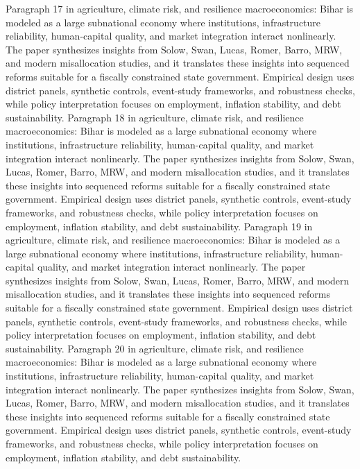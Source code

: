 \documentclass[preprint,12pt]{elsarticle}
\begin{document}
Paragraph 17 in agriculture, climate risk, and resilience macroeconomics: Bihar is modeled as a large subnational economy where institutions, infrastructure reliability, human-capital quality, and market integration interact nonlinearly. The paper synthesizes insights from Solow, Swan, Lucas, Romer, Barro, MRW, and modern misallocation studies, and it translates these insights into sequenced reforms suitable for a fiscally constrained state government. Empirical design uses district panels, synthetic controls, event-study frameworks, and robustness checks, while policy interpretation focuses on employment, inflation stability, and debt sustainability.
Paragraph 18 in agriculture, climate risk, and resilience macroeconomics: Bihar is modeled as a large subnational economy where institutions, infrastructure reliability, human-capital quality, and market integration interact nonlinearly. The paper synthesizes insights from Solow, Swan, Lucas, Romer, Barro, MRW, and modern misallocation studies, and it translates these insights into sequenced reforms suitable for a fiscally constrained state government. Empirical design uses district panels, synthetic controls, event-study frameworks, and robustness checks, while policy interpretation focuses on employment, inflation stability, and debt sustainability.
Paragraph 19 in agriculture, climate risk, and resilience macroeconomics: Bihar is modeled as a large subnational economy where institutions, infrastructure reliability, human-capital quality, and market integration interact nonlinearly. The paper synthesizes insights from Solow, Swan, Lucas, Romer, Barro, MRW, and modern misallocation studies, and it translates these insights into sequenced reforms suitable for a fiscally constrained state government. Empirical design uses district panels, synthetic controls, event-study frameworks, and robustness checks, while policy interpretation focuses on employment, inflation stability, and debt sustainability.
Paragraph 20 in agriculture, climate risk, and resilience macroeconomics: Bihar is modeled as a large subnational economy where institutions, infrastructure reliability, human-capital quality, and market integration interact nonlinearly. The paper synthesizes insights from Solow, Swan, Lucas, Romer, Barro, MRW, and modern misallocation studies, and it translates these insights into sequenced reforms suitable for a fiscally constrained state government. Empirical design uses district panels, synthetic controls, event-study frameworks, and robustness checks, while policy interpretation focuses on employment, inflation stability, and debt sustainability.
\end{document}
